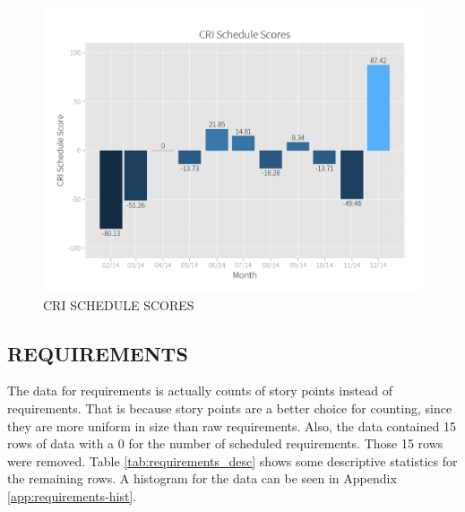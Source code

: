 \documentclass[SDSUThesis.tex]{subfiles}
\begin{document}
        \begin{figure}[htb]
            \centering
            \includegraphics[scale=.3]{images/schedule_scores.png}
            \caption{CRI SCHEDULE SCORES}
            \label{fig:schedule-scores}
        \end{figure}
        
        
    \subsection{REQUIREMENTS}
    \label{sec:case-req}
        The data for requirements is actually counts of story points
        instead of requirements.  That is because story points
        are a better choice for counting, since they are more
        uniform in size than raw requirements.  Also, the data
        contained 15 rows of data with a 0 for the number of
        scheduled requirements.  Those 15 rows were removed.
        Table \ref{tab:requirements_desc} shows some descriptive
        statistics for the remaining rows. A histogram for the
        data can be seen in Appendix \ref{app:requirements-hist}.
        
\end{document}
